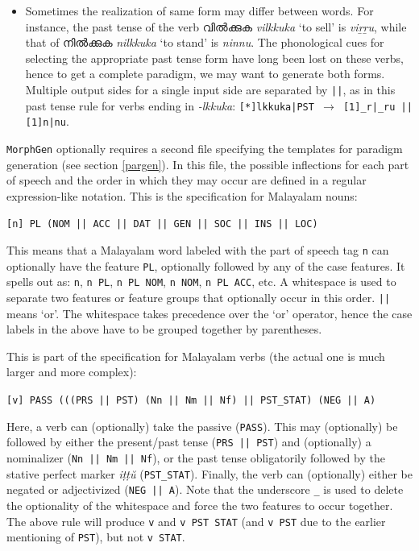 \documentclass[a4paper]{article}
\newcommand{\arr}{$\rightarrow$ }
\newcommand{\typ}[1]{\texttt{#1}}
\begin{document}
\begin{itemize}
\item Sometimes the realization of same form may differ between words. For instance, the past tense of the verb വിൽക്കുക \textit{vilkkuka} `to sell' is \textit{viṟṟu}, while that of നിൽക്കുക \textit{nilkkuka} `to stand' is \textit{ninnu}. The phonological cues for selecting the appropriate past tense form have long been lost on these verbs, hence to get a complete paradigm, we may want to generate both forms. Multiple output sides for a single input side are separated by \typ{||}, as in this past tense rule for verbs ending in \textit{-lkkuka}: \typ{[*]lkkuka|PST \arr [1]\_r|\_ru || [1]n|nu}.
\end{itemize}

\label{parfile}\typ{MorphGen} optionally requires a second file specifying the templates for paradigm generation (see section \ref{pargen}). In this file, the possible inflections for each part of speech and the order in which they may occur are defined in a regular expression-like notation. This is the specification for Malayalam nouns:

\typ{[n] PL (NOM || ACC || DAT || GEN || SOC || INS || LOC)}

This means that a Malayalam word labeled with the part of speech tag \typ{n} can optionally have the feature \typ{PL}, optionally followed by any of the case features. It spells out as: \typ{n}, \typ{n PL}, \typ{n PL NOM}, \typ{n NOM}, \typ{n PL ACC}, etc. A whitespace is used to separate two features or feature groups that optionally occur in this order. \typ{||} means `or'. The whitespace takes precedence over the `or' operator, hence the case labels in the above have to be grouped together by parentheses.

This is part of the specification for Malayalam verbs (the actual one is much larger and more complex):

\typ{[v] PASS (((PRS || PST) (Nn || Nm || Nf) || PST\_STAT) (NEG || A)}

Here, a verb can (optionally) take the passive (\typ{PASS}). This may (optionally) be followed by either the present/past tense (\typ{PRS || PST}) and (optionally) a nominalizer (\typ{Nn || Nm || Nf}), or the past tense obligatorily followed by the stative perfect marker \textit{iṭṭŭ} (\typ{PST\_STAT}). Finally, the verb can (optionally) either be negated or adjectivized (\typ{NEG || A}). Note that the underscore \typ{\_} is used to delete the optionality of the whitespace and force the two features to occur together. The above rule will produce \typ{v} and \typ{v PST STAT} (and \typ{v PST} due to the earlier mentioning of \typ{PST}), but not \typ{v STAT}.
\end{document}
